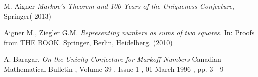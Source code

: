  
 


 
 


%
%
%
%
% 
%



%

%
%




M. Aigner
\textit{Markov's Theorem and 100 Years of the Uniqueness Conjecture}, Springer( 2013)

Aigner M., Ziegler G.M.  
\textit{Representing numbers as sums of two squares.} In: Proofs from THE BOOK. Springer, Berlin, Heidelberg. (2010)

A. Baragar,
\textit{On the Unicity Conjecture for Markoff Numbers}
Canadian Mathematical Bulletin , Volume 39 , Issue 1 , 01 March 1996 , pp. 3 - 9


